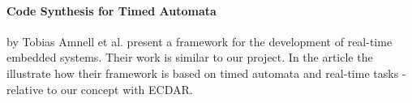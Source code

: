 \paragraph{Code Synthesis for Timed Automata}
by Tobias Amnell et al. present a framework for the development of real-time
embedded systems\cite{Amnell:2002:CST:779110.779112}. Their work is similar to
our project. In the article the illustrate how their framework is based on timed
automata and real-time tasks - relative to our concept with ECDAR.

